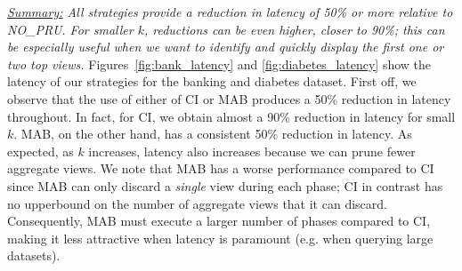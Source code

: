 

{\em \underline{Summary:} All strategies provide a reduction in latency of 50\% or more
relative to NO\_PRU. For smaller $k$, reductions can be even higher, closer to 90\%; this can be
especially useful when we want to identify and quickly display the first one or two top views.}
Figures~\ref{fig:bank_latency} and \ref{fig:diabetes_latency} show the latency
of our strategies for the banking and diabetes dataset.
First off, we observe that the use of either of CI or MAB produces a 50\% reduction in latency
throughout.
In fact, for CI, we obtain almost a 90\% reduction in latency for small $k$. 
MAB, on the other hand, has a consistent 50\% reduction in latency. 
As expected, as $k$ increases, latency also increases because we can prune fewer aggregate views.
We note that MAB has a worse performance compared to CI since MAB can only discard a 
{\it single} view during each phase; CI in contrast has no upperbound on the number of aggregate views that it
can discard.
Consequently, MAB must execute a larger number of phases compared to CI, making it less attractive
when latency is paramount (e.g. when querying large datasets).

